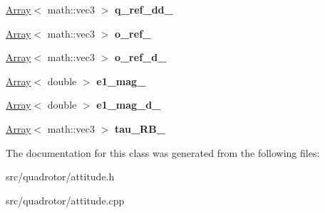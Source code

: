 \begin{DoxyCompactItemize}
\item 
\hypertarget{classAttitude_adafdcc5ea0edf640443a54e0a1c8195e}{\hyperlink{classArray}{\-Array}$<$ math\-::vec3 $>$ {\bfseries q\-\_\-ref\-\_\-dd\-\_\-}}\label{classAttitude_adafdcc5ea0edf640443a54e0a1c8195e}

\item 
\hypertarget{classAttitude_a07ff1dc9f3a307aaa7744c4cc18b85b2}{\hyperlink{classArray}{\-Array}$<$ math\-::vec3 $>$ {\bfseries o\-\_\-ref\-\_\-}}\label{classAttitude_a07ff1dc9f3a307aaa7744c4cc18b85b2}

\item 
\hypertarget{classAttitude_ada75e65bfb26b7656e76cbd5500d2a66}{\hyperlink{classArray}{\-Array}$<$ math\-::vec3 $>$ {\bfseries o\-\_\-ref\-\_\-d\-\_\-}}\label{classAttitude_ada75e65bfb26b7656e76cbd5500d2a66}

\item 
\hypertarget{classAttitude_a96f44c3ffba76b9cc233fca1727b23ff}{\hyperlink{classArray}{\-Array}$<$ double $>$ {\bfseries e1\-\_\-mag\-\_\-}}\label{classAttitude_a96f44c3ffba76b9cc233fca1727b23ff}

\item 
\hypertarget{classAttitude_a45e77bc2aa5f7f449ea6d813465b6390}{\hyperlink{classArray}{\-Array}$<$ double $>$ {\bfseries e1\-\_\-mag\-\_\-d\-\_\-}}\label{classAttitude_a45e77bc2aa5f7f449ea6d813465b6390}

\item 
\hypertarget{classAttitude_ac1877b6ed64892ddcffc95e95591b484}{\hyperlink{classArray}{\-Array}$<$ math\-::vec3 $>$ {\bfseries tau\-\_\-\-R\-B\-\_\-}}\label{classAttitude_ac1877b6ed64892ddcffc95e95591b484}

\end{DoxyCompactItemize}


\-The documentation for this class was generated from the following files\-:\begin{DoxyCompactItemize}
\item 
src/quadrotor/attitude.\-h\item 
src/quadrotor/attitude.\-cpp\end{DoxyCompactItemize}

